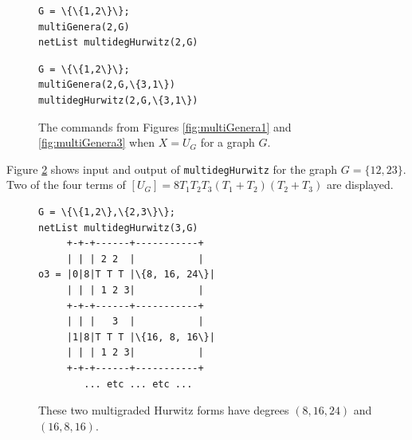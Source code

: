 \documentclass[12pt]{article}
\theoremstyle{definition}
\newenvironment{example}
{\pushQED{\qed}\renewcommand{\qedsymbol}{$\diamond$}\examplex}
{\popQED\endexamplex}
\begin{document}
\begin{figure}[h]
\centering
\begin{minipage}{.48\textwidth}
\begin{tcolorbox}[size=fbox,width=\linewidth,colback=blue!5!white,colframe=blue!75!black]
\begin{Verbatim}[fontsize=\small,commandchars=\\\{\}]
G = \{\{1,2\}\};
multiGenera(2,G)
netList multidegHurwitz(2,G)
\end{Verbatim}
\end{tcolorbox}
\end{minipage}
\begin{minipage}{.48\textwidth}
\begin{tcolorbox}[size=fbox,width=\linewidth,colback=blue!5!white,colframe=blue!75!black]
\begin{Verbatim}[fontsize=\small,commandchars=\\\{\}]
G = \{\{1,2\}\};
multiGenera(2,G,\{3,1\})
multidegHurwitz(2,G,\{3,1\})
\end{Verbatim}
\end{tcolorbox}
\end{minipage}
\caption{The commands from Figures \ref{fig:multiGenera1} and \ref{fig:multiGenera3}
when  $X = U_G$ for a graph $G$.}
\label{fig:multiGenera4}
\end{figure}


\begin{example}[$\ell=3$] \label{ex:twoedges}
Figure \ref{fig:multidegHurwitz} shows input and output of {\tt multidegHurwitz} for
the graph $G = \{12,23\}$. Two of the four terms of
 $[U_G] = 8 T_1 T_2 T_3 (T_1+T_2)(T_2+T_3)$ are displayed.
\end{example}

\begin{figure}[h]
\centering
\begin{tcolorbox}[size=fbox,width=0.5\linewidth,colback=blue!5!white,colframe=blue!75!black]
\begin{Verbatim}[fontsize=\scriptsize,commandchars=\\\{\}]
G = \{\{1,2\},\{2,3\}\};
netList multidegHurwitz(3,G)
     +-+-+------+-----------+
     | | | 2 2  |           |
o3 = |0|8|T T T |\{8, 16, 24\}|
     | | | 1 2 3|           |
     +-+-+------+-----------+
     | | |   3  |           |
     |1|8|T T T |\{16, 8, 16\}|
     | | | 1 2 3|           |
     +-+-+------+-----------+
        ... etc ... etc ...
\end{Verbatim}
\end{tcolorbox}
\caption{These two multigraded Hurwitz forms have degrees $(8,16,24)$ and $(16,8,16)$.
}\label{fig:multidegHurwitz}
\end{figure}
\end{document}
